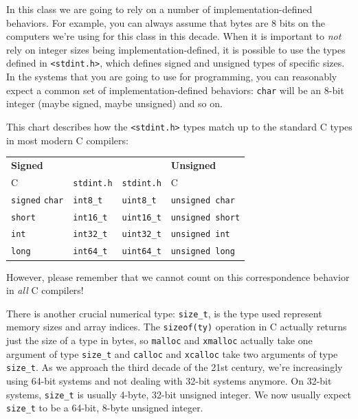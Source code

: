 In this class we are going to rely on a number of
implementation-defined behaviors. For example, you can always assume
that bytes are 8 bits on the computers we're using for this class in
this decade.  When it is important to \emph{not} rely on integer sizes
being implementation-defined, it is possible to use the types defined
in \lstinline'<stdint.h>', which defines signed and unsigned types of
specific sizes. In the systems that you are going to use for
programming, you can reasonably expect a common set of
implementation-defined behaviors: \lstinline'char' will be an 8-bit
integer (maybe signed, maybe unsigned) and so on.

\clearpage
\noindent
This chart describes how the \lstinline'<stdint.h>' types match up to
the standard C types in most modern C compilers:
\begin{center}
\begin{tabular}{ll|ll}
   \textbf{Signed}
&&&\textbf{Unsigned}
\\  C
 & \lstinline'stdint.h'
 & \lstinline'stdint.h'
 & C
\\ [1ex]
   \lstinline'signed' \lstinline'char'
 & \lstinline'int8_t'
 & \lstinline'uint8_t'
 & \lstinline'unsigned char'
\\ \lstinline'short'
 & \lstinline'int16_t'
 & \lstinline'uint16_t'
 & \lstinline'unsigned short'
\\ \lstinline'int'
 & \lstinline'int32_t'
 & \lstinline'uint32_t'
 & \lstinline'unsigned int'
\\ \lstinline'long'
 & \lstinline'int64_t'
 & \lstinline'uint64_t'
 & \lstinline'unsigned long'
\end{tabular}
\end{center}
However, please remember that we cannot count on this correspondence
behavior in \emph{all} C compilers!

There is another crucial numerical type: \lstinline'size_t', is the
type used represent memory sizes and array indices. The
\lstinline'sizeof(ty)' operation in C actually returns just the size
of a type in bytes, so \lstinline'malloc' and \lstinline'xmalloc'
actually take one argument of type \lstinline'size_t' and
\lstinline'calloc' and \lstinline'xcalloc' take two arguments of type
\lstinline'size_t'. As we approach the third decade of the 21st
century, we're increasingly using 64-bit systems and not dealing with
32-bit systems anymore. On 32-bit systems, \lstinline'size_t' is
usually 4-byte, 32-bit unsigned integer. We now usually expect
\lstinline'size_t' to be a 64-bit, 8-byte unsigned integer.

